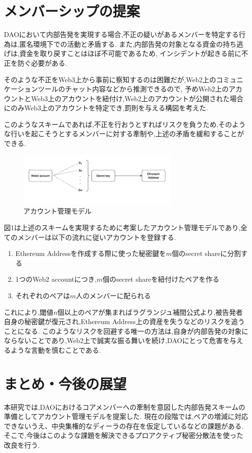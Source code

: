 \documentclass[10pt,twocolumn,a4j]{jarticle}
\begin{document}
\section{\normalsize メンバーシップの提案\vspace{-5pt}}
DAOにおいて内部告発を実現する場合,不正の疑いがあるメンバーを特定する行為は,匿名環境下での活動と矛盾する.
また,内部告発の対象となる資金の持ち逃げは,資金を取り戻すことはほぼ不可能であるため,
インシデントが起きる前に不正を防ぐ必要がある.

そのような不正をWeb3上から事前に察知するのは困難だが,Web2上のコミュニケーションツールのチャット内容などから推測できるので,
予めWeb2上のアカウントとWeb3上のアカウントを紐付け,Web2上のアカウントが公開された場合にのみWeb3上のアカウントを特定でき,罰則を与える構図を考えた.

このようなスキームであれば,不正を行おうとすればリスクを負うため,そのような行いを起こそうとするメンバーに対する牽制や,上述の矛盾を緩和することができる.
\begin{figure}[htbp]
  \begin{center}
    \includegraphics[width=80mm]{account.png}
    \caption{アカウント管理モデル}
  \end{center}
\end{figure}
\vspace{-20pt}

図1は上述のスキームを実現するために考案したアカウント管理モデルであり,全てのメンバーは以下の流れに従いアカウントを登録する.
\begin{enumerate}
  \vspace{-5pt}
  \item Ethereum Addressを作成する際に使った秘密鍵を$m$個のsecret shareに分割する\vspace{-5pt}
  \item 1つのWeb2 accountにつき,$m$個のsecret shareを紐付けたペアを作る\vspace{-5pt}
  \item それぞれのペアは$m$人のメンバーに配られる\vspace{-5pt}
\end{enumerate}
これにより,閾値$n$個以上のペアが集まればラグランジュ補間公式より,被告発者自身の秘密鍵が復元され,Ethereum Address上の資産を失うなどのリスクを追うことになる.
このようなリスクを回避する唯一の方法は,自身が内部告発の対象にならないことであり,Web2上で誠実な振る舞いを続け,DAOにとって危害を与えるような言動を慎むことである.
\vspace{-20pt}

\section{\normalsize まとめ・今後の展望\vspace{-5pt}}
本研究では,DAOにおけるコアメンバーへの牽制を意図した内部告発スキームの準備としてアカウント管理モデルを提案した.
現在の段階では,ペアの増減に対応できないうえ、中央集権的なディーラの存在を仮定しているなどの課題がある.そこで,今後はこのような課題を解決できるプロアクティブ秘密分散法を使った改良を行う.
\end{document}
